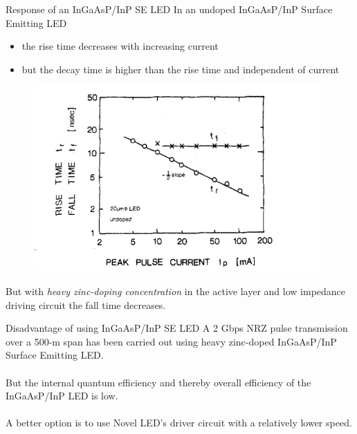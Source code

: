 \documentclass[mathserif]{beamer}
\begin{document}
    
    \begin{frame}{Response of an InGaAsP/InP SE LED}
        \pause
        In an undoped InGaAsP/InP Surface Emitting LED
        \begin{itemize}
            \pause \item the rise time decreases with increasing current
            \pause \item but the decay time is higher than the rise time and independent of current
        \end{itemize}
        \pause
 	    \begin{figure}
             \centering
             \includegraphics[height=0.4\textheight]{undopedSCLEDResponse.png}
        \end{figure}
        \pause
        But with \emph{heavy zinc-doping concentration} in the active layer and low impedance driving circuit the fall time decreases.
    \end{frame}
    
    

	\begin{frame}{Disadvantage of using InGaAsP/InP SE LED}
        \pause A 2 Gbps NRZ pulse transmission over a 500-m span has been carried out using heavy zinc-doped InGaAsP/InP Surface Emitting LED. \\~\\
        \pause But the internal quantum efficiency and thereby overall efficiency of the InGaAsP/InP LED is low. \\~\\
        \pause A better option is to use Novel LED's driver circuit with a relatively lower speed.
    \end{frame}
    
\end{document}
